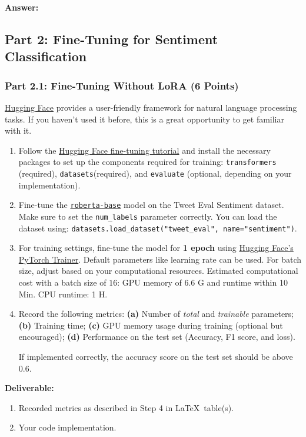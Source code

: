 \documentclass[11pt, oneside]{article}   	%
\begin{document}
\textbf{Answer:} \\

\subsection*{Part 2:  Fine-Tuning for Sentiment Classification}
\subsubsection*{Part 2.1: Fine-Tuning Without LoRA (6 Points)}
\href{https://huggingface.co/}{Hugging Face} provides a user-friendly framework for natural language processing tasks. If you haven't used it before, this is a great opportunity to get familiar with it. 

\begin{enumerate}
    \item Follow the \href{https://huggingface.co/docs/transformers/training}{Hugging Face fine-tuning tutorial} and install the necessary packages to set up the components required for training: \texttt{transformers} (required), \texttt{datasets}(required), and \texttt{evaluate} (optional, depending on your implementation).
    \item Fine-tune the \texttt{\href{https://huggingface.co/roberta-base}{roberta-base}} model on the Tweet Eval Sentiment dataset. Make sure to set the \texttt{num\_labels} parameter correctly. You can load the dataset using: \texttt{datasets.load\_dataset("tweet\_eval", name="sentiment")}.
    \item For training settings, fine-tune the model for \textbf{1 epoch} using \href{https://huggingface.co/docs/transformers/training#trainer}{Hugging Face's PyTorch Trainer}. Default parameters like learning rate can be used. For batch size, adjust based on your computational resources. Estimated computational cost with a batch size of $16$: GPU memory of 6.6 G and runtime within 10 Min. CPU runtime: 1 H.
    
    \item \label{step4} Record the following metrics: \textbf{(a)} Number of \textit{total} and \textit{trainable} parameters;  \textbf{(b)} Training time; \textbf{(c)} GPU memory usage during training (optional but encouraged); \textbf{(d)} Performance on the test set (Accuracy, F1 score, and loss).

    If implemented correctly, the accuracy score on the test set should be above $0.6$.
\end{enumerate}
\textbf{Deliverable:}
\begin{enumerate}
    \item Recorded metrics as described in Step 4 in \LaTeX~table(s).
    \item Your code implementation.
\end{enumerate}
\end{document}
